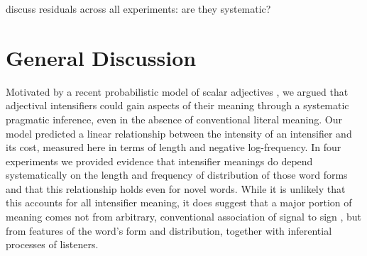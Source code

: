 \documentclass[10pt,letterpaper]{article}
\newcommand{\todo}[1]{{\color{red}#1}}
\begin{document}
\todo{discuss residuals across all experiments: are they systematic?}

\section{General Discussion}

Motivated by a recent probabilistic model of scalar adjectives \cite{lassiter}, we argued that adjectival intensifiers could gain aspects of their meaning through a systematic pragmatic inference, even in the absence of conventional literal meaning. Our model predicted a linear relationship between the intensity of an intensifier and its cost, measured here in terms of length and negative log-frequency.
In four experiments we provided evidence that intensifier meanings do depend systematically on the length and frequency of distribution of those word forms and that this relationship holds even for novel words.
While it is unlikely that this accounts for all intensifier meaning, it does suggest that a major portion of meaning comes not from arbitrary, conventional association of signal to sign \cite{saussure}, but from features of the word's form and distribution, together with inferential processes of listeners.

\end{document}
